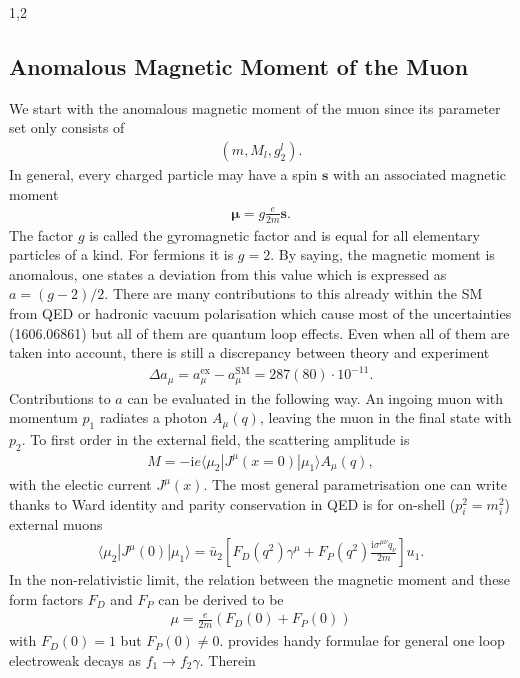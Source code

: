 \documentclass[11pt,a4paper,twoside]{article}
\numberwithin{equation}{section}
\newcommand{\ti}{\text{i}}
\begin{document}
\begin{spacing}{1,2}
\subsection{Anomalous Magnetic Moment of the Muon}
We start with the anomalous magnetic moment of the muon since its parameter set only consists of 
\begin{align}
 \left(m, M_l, g_2^l\right).
\end{align}
In general, every charged particle
may have a spin $\boldsymbol{s}$ with an associated magnetic moment \cite{anomMom}
\begin{align}
 \boldsymbol{\mu} = g \frac{e}{2m}\boldsymbol{s}.
\end{align}
The factor $g$ is called the gyromagnetic factor and is equal for all elementary particles of a kind. For fermions it is $g=2$. By saying, the magnetic 
moment is anomalous, one states a deviation from this value which is expressed as $a= (g-2)/2$. There are many contributions to this already within the SM
from QED or hadronic vacuum polarisation which cause most of the uncertainties (1606.06861) but all of them are quantum loop effects. Even when all of them are taken into account, there is still a discrepancy
between theory and experiment 
\begin{align}
 \Delta a_\mu = a_\mu^\text{ex} - a_\mu^\text{SM} = 287(80)\cdot 10^{-11}.
\end{align}
Contributions to $a$ can be evaluated in the following way. An ingoing muon with momentum $p_1$ radiates a photon $A_\mu (q)$, leaving the muon in the final 
state with $p_2$. To first order in the external field, the scattering amplitude is 
\begin{align}
 M = -\ti e \langle \mu_2|J^\mu(x=0)|\mu_1\rangle A_\mu(q),
\end{align}
with the electic current $J^\mu(x)$. The most general parametrisation one can write thanks to Ward identity and parity conservation in QED is for on-shell
($p_i^2 = m_i^2$) external muons
\begin{align}
 \langle \mu_2|J^\mu(0)|\mu_1\rangle = \bar u_2 \left[F_D(q^2)\gamma^\mu + F_P(q^2)\frac{\ti \sigma^{\mu\nu}q_\nu}{2m}\right] u_1.
\end{align}
In the non-relativistic limit, the relation between the magnetic moment and these form factors $F_D$ and $F_P$ can be derived to be
\begin{align}
 \mu = \frac{e}{2m}\left(F_D(0) + F_P(0)\right)
\end{align}
\noindent
with $F_D(0)=1$ but $F_P(0)\neq0$. \cite{Lavoura} provides handy formulae for general one loop electroweak decays as $f_1 \rightarrow f_2 \gamma$. Therein

\end{spacing}
\end{document}
